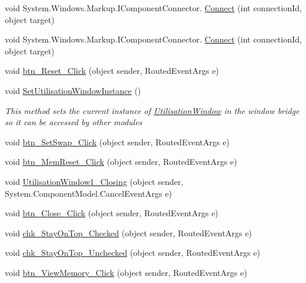 \begin{DoxyCompactItemize}
\item 
void System.\+Windows.\+Markup.\+I\+Component\+Connector. \hyperlink{class_c_p_u___o_s___simulator_1_1_utilisation_window_a97df3234e18d7c4aa6fab7f061db9f37}{Connect} (int connection\+Id, object target)
\item 
void System.\+Windows.\+Markup.\+I\+Component\+Connector. \hyperlink{class_c_p_u___o_s___simulator_1_1_utilisation_window_a97df3234e18d7c4aa6fab7f061db9f37}{Connect} (int connection\+Id, object target)
\item 
void \hyperlink{class_c_p_u___o_s___simulator_1_1_utilisation_window_a0dc6503f9fc759dd31c01ebd5f37804c}{btn\+\_\+\+Reset\+\_\+\+Click} (object sender, Routed\+Event\+Args e)
\item 
void \hyperlink{class_c_p_u___o_s___simulator_1_1_utilisation_window_a359a3ec3583fb6085f00b74a8deb2a90}{Set\+Utilisation\+Window\+Instance} ()
\begin{DoxyCompactList}\small\item\em This method sets the current instance of \hyperlink{class_c_p_u___o_s___simulator_1_1_utilisation_window}{Utilisation\+Window} in the window bridge so it can be accessed by other modules \end{DoxyCompactList}\item 
void \hyperlink{class_c_p_u___o_s___simulator_1_1_utilisation_window_aed023b6f80654f157d65b7e53a244aa8}{btn\+\_\+\+Set\+Swap\+\_\+\+Click} (object sender, Routed\+Event\+Args e)
\item 
void \hyperlink{class_c_p_u___o_s___simulator_1_1_utilisation_window_aec297d4f0a382426a2f7daaef458306b}{btn\+\_\+\+Mem\+Reset\+\_\+\+Click} (object sender, Routed\+Event\+Args e)
\item 
void \hyperlink{class_c_p_u___o_s___simulator_1_1_utilisation_window_aa5778dbb0ff4540b716001b327b24eb3}{Utilisation\+Window1\+\_\+\+Closing} (object sender, System.\+Component\+Model.\+Cancel\+Event\+Args e)
\item 
void \hyperlink{class_c_p_u___o_s___simulator_1_1_utilisation_window_a5a9475496687f51fa160851a5641c46e}{btn\+\_\+\+Close\+\_\+\+Click} (object sender, Routed\+Event\+Args e)
\item 
void \hyperlink{class_c_p_u___o_s___simulator_1_1_utilisation_window_a09e06074e4a466c4579efa7d4eef2d61}{chk\+\_\+\+Stay\+On\+Top\+\_\+\+Checked} (object sender, Routed\+Event\+Args e)
\item 
void \hyperlink{class_c_p_u___o_s___simulator_1_1_utilisation_window_a320418083c8d16537e7d02bf8b1db8b7}{chk\+\_\+\+Stay\+On\+Top\+\_\+\+Unchecked} (object sender, Routed\+Event\+Args e)
\item 
void \hyperlink{class_c_p_u___o_s___simulator_1_1_utilisation_window_ab9bba185740b0702eb613e6d545f760e}{btn\+\_\+\+View\+Memory\+\_\+\+Click} (object sender, Routed\+Event\+Args e)
\end{DoxyCompactItemize}
